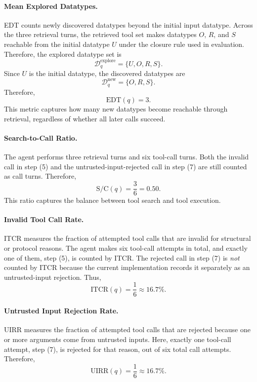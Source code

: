 \paragraph{Mean Explored Datatypes.}
EDT counts newly discovered datatypes beyond the initial input datatype.
Across the three retrieval turns, the retrieved tool set makes datatypes $O$, $R$, and $S$ reachable from the initial datatype $U$ under the closure rule used in evaluation.
Therefore, the explored datatype set is
\begin{equation}
\mathcal{D}^{\mathrm{explore}}_q = \{U,O,R,S\}.
\end{equation}
Since $U$ is the initial datatype, the discovered datatypes are
\begin{equation}
\mathcal{D}^{\mathrm{new}}_q = \{O,R,S\}.
\end{equation}
Therefore,
\begin{equation}
\mathrm{EDT}(q)=3.
\end{equation}
This metric captures how many new datatypes become reachable through retrieval, regardless of whether all later calls succeed.

\paragraph{Search-to-Call Ratio.}
The agent performs three retrieval turns and six tool-call turns.
Both the invalid call in step (5) and the untrusted-input-rejected call in step (7) are still counted as call turns.
Therefore,
\begin{equation}
\mathrm{S/C}(q)=\frac{3}{6}=0.50.
\end{equation}
This ratio captures the balance between tool search and tool execution.

\paragraph{Invalid Tool Call Rate.}
ITCR measures the fraction of attempted tool calls that are invalid for structural or protocol reasons. 
The agent makes six tool-call attempts in total, and exactly one of them, step (5), is counted by ITCR.
The rejected call in step (7) is \emph{not} counted by ITCR because the current implementation records it separately as an untrusted-input rejection.
Thus,
\begin{equation}
\mathrm{ITCR}(q)=\frac{1}{6}\approx 16.7\%.
\end{equation}

\paragraph{Untrusted Input Rejection Rate.}
UIRR measures the fraction of attempted tool calls that are rejected because one or more arguments come from untrusted inputs. 
Here, exactly one tool-call attempt, step (7), is rejected for that reason, out of six total call attempts.
Therefore,
\begin{equation}
\mathrm{UIRR}(q)=\frac{1}{6}\approx 16.7\%.
\end{equation}


